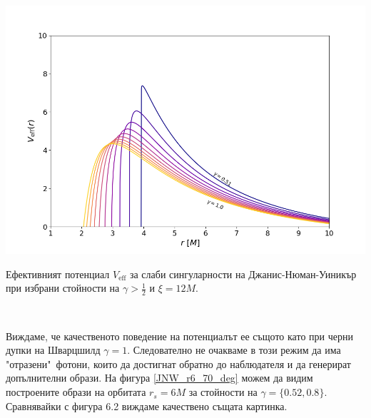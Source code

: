 \begin{minipage}{18em}
	\hspace{-0.5cm}
	\includegraphics[scale = 0.3]{JNW_eff_potential_photon_sphere.png}
	\caption[Ефективният потенциал за слаби сингуларности на Джанис-Нюман-Уиникър]{Ефективният потенциал $V_\text{eff}$ за слаби сингуларности на Джанис-Нюман-Уиникър при избрани стойности на $\gamma > \frac{1}{2}$ и $\xi = 12M$.}
\end{minipage}\,\,
\begin{minipage}{18em}
	Виждаме, че качественото поведение на потенциалът ее същото като при черни дупки на Шварцшилд $\gamma = 1$. Следователно не очакваме в този режим да има "отразени"$\,$ фотони, които да достигнат обратно до наблюдателя и да генерират допълнителни образи. На фигура \ref{JNW_r6_70_deg} можем да видим построените образи на орбитата $r_s = 6M$ за стойности на $\gamma = \{0.52, 0.8\}$. Сравнявайки с фигура 6.2 виждаме качествено същата картинка.
\end{minipage}
